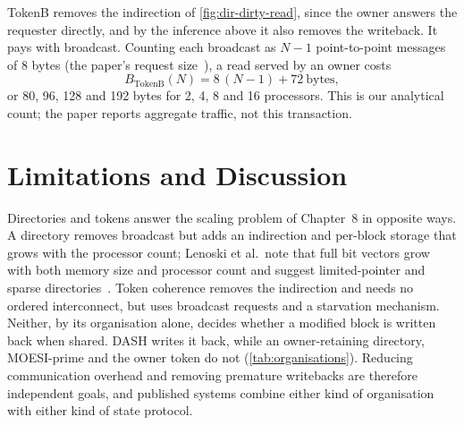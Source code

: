 TokenB removes the indirection of \cref{fig:dir-dirty-read}, since the owner answers
the requester directly, and by the inference above it also removes the writeback.
It pays with broadcast. Counting each broadcast as $N-1$ point-to-point messages of
8 bytes (the paper's request size~\cite[\S5.1]{martin2003token}), a read served by
an owner costs
\begin{equation}
  B_{\mathrm{TokenB}}(N) = 8\,(N-1) + 72 \ \text{bytes},
  \label{eq:tokenb}
\end{equation}
or 80, 96, 128 and 192 bytes for 2, 4, 8 and 16 processors. This is our analytical
count; the paper reports aggregate traffic, not this transaction.

\section{Limitations and Discussion}
\label{sec:scal-discussion}
%

Directories and tokens answer the scaling problem of Chapter~8 in opposite ways. A
directory removes broadcast but adds an indirection and per-block storage that
grows with the processor count; Lenoski et al.\ note that full bit vectors grow with
both memory size and processor count and suggest limited-pointer and sparse
directories~\cite[\S6]{lenoski1990dash}. Token coherence removes the indirection and
needs no ordered interconnect, but uses broadcast requests and a starvation
mechanism. Neither, by its organisation alone, decides whether a modified block is
written back when shared. DASH writes it back, while an owner-retaining directory,
MOESI-prime and the owner token do not (\cref{tab:organisations}). Reducing
communication overhead and removing premature writebacks are therefore independent
goals, and published systems combine either kind of organisation with either kind
of state protocol.

